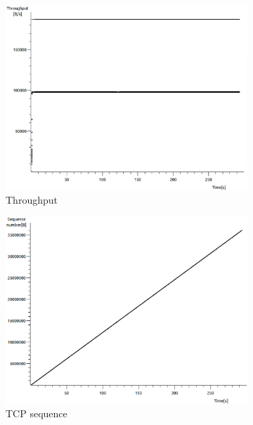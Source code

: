 \documentclass[conference,a4paper]{IEEEtran}
\begin{document}
\begin{figure}
 \centering
 \begin{subfigure}[b]{0.2\textwidth}
  \includegraphics[width=\textwidth]{s7-0_th}
  \caption{Throughput}
 \end{subfigure}
 \begin{subfigure}[b]{0.2\textwidth}
  \includegraphics[width=\textwidth]{s7-0_seq}
  \caption{TCP sequence}
 \end{subfigure}
 \begin{subfigure}[b]{0.2\textwidth}

\end{subfigure}
\end{figure}
\end{document}
